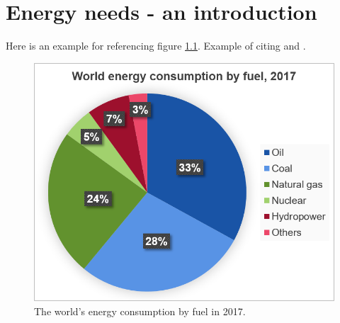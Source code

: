 \documentclass[electronic]{kthesis}
\begin{document}
	\chapter{Energy needs - an introduction}
	\label{Intro}
	Here is an example for referencing figure \ref{EnergySources}. Example of citing \cite{BP2019} and \cite{Chen2016}.
	\begin{figure}[h]
		\centering
		\includegraphics[scale=0.6]{Figs/Ch1_EnergySources.png}
		\caption{The world's energy consumption by fuel in 2017. }
		\label{EnergySources}
	\end{figure}
	
\end{document}
